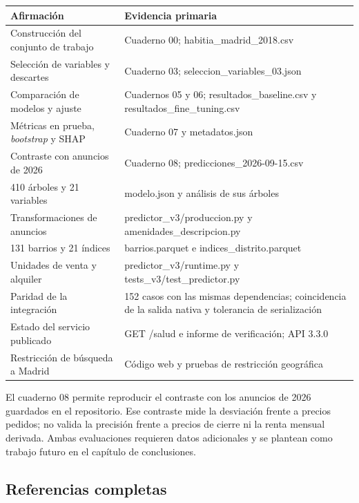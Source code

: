\documentclass[11pt,a4paper]{article}
\newcommand{\thead}[1]{\textbf{#1}}
\newcounter{anexo}
\newcounter{anexosub}[anexo]
\begin{document}
\begin{center}
\begin{tabularx}{\linewidth}{@{}L L@{}}
\toprule
\thead{Afirmación} & \thead{Evidencia primaria} \\
\midrule
Construcción del conjunto de trabajo & Cuaderno 00; habitia\_madrid\_2018.csv \\
Selección de variables y descartes & Cuaderno 03; seleccion\_variables\_03.json \\
Comparación de modelos y ajuste & Cuadernos 05 y 06; resultados\_baseline.csv y resultados\_fine\_tuning.csv \\
Métricas en prueba, \emph{bootstrap} y SHAP & Cuaderno 07 y metadatos.json \\
Contraste con anuncios de 2026 & Cuaderno 08; predicciones\_2026-09-15.csv \\
410 árboles y 21 variables & modelo.json y análisis de sus árboles \\
Transformaciones de anuncios & predictor\_v3/produccion.py y amenidades\_descripcion.py \\
131 barrios y 21 índices & barrios.parquet e indices\_distrito.parquet \\
Unidades de venta y alquiler & predictor\_v3/runtime.py y tests\_v3/test\_predictor.py \\
Paridad de la integración & 152 casos con las mismas dependencias; coincidencia de la salida nativa y tolerancia de serialización \\
Estado del servicio publicado & GET /salud e informe de verificación; API 3.3.0 \\
Restricción de búsqueda a Madrid & Código web y pruebas de restricción geográfica \\
\bottomrule
\end{tabularx}
\end{center}

El cuaderno 08 permite reproducir el contraste con los anuncios de 2026 guardados en el repositorio. Ese contraste mide la desviación frente a precios pedidos; no valida la precisión frente a precios de cierre ni la renta mensual derivada. Ambas evaluaciones requieren datos adicionales y se plantean como trabajo futuro en el capítulo de conclusiones.

%
\subsection*{\theanexo\hspace{0.3em}\hspace{0.45em}Referencias completas}
\end{document}
